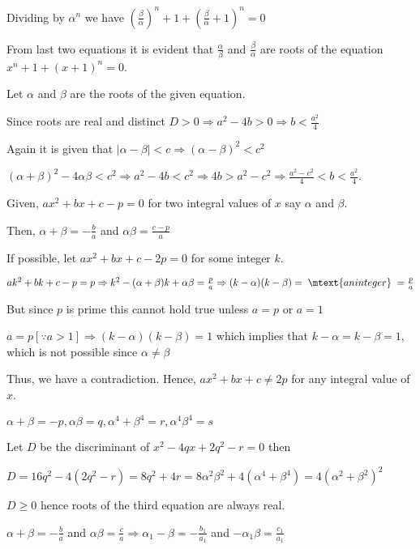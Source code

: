   Dividing by $\alpha^n$ we have
  $\left(\frac{\beta}{\alpha}\right)^n + 1 + \left(\frac{\beta}{\alpha} + 1\right)^n = 0$

  From last two equations it is evident that $\frac{\alpha}{\beta}$ and $\frac{\beta}{\alpha}$ are roots
  of the equation $x^n + 1 + (x + 1)^n = 0$.
\item Let $\alpha$ and $\beta$ are the roots of the given equation.

  Since roots are real and distinct $D > 0 \Rightarrow a^2 - 4b > 0 \Rightarrow b < \frac{a^2}{4}$

  Again it is given that $|\alpha - \beta| < c \Rightarrow (\alpha - \beta)^2 < c^2$

  $(\alpha + \beta)^2 - 4\alpha\beta < c^2 \Rightarrow a^2 - 4b < c^2 \Rightarrow 4b > a^2 - c^2\Rightarrow
  \frac{a^2 - c^2}{4} < b < \frac{a^2}{4}$.
\item Given, $ax^2 + bx + c - p = 0$ for two integral values of $x$ say $\alpha$ and $\beta$.

  Then, $\alpha + \beta = -\frac{b}{a}$ and $\alpha\beta = \frac{c - p}{a}$

  If possible, let $ax^2 + bx + c - 2p = 0$ for some integer $k$.

  $ak^2 + bk + c - p = p \Rightarrow k^2 - (\alpha + \beta)k + \alpha\beta = \frac{p}{a}\Rightarrow (k -
  \alpha)(k - \beta) =\;\mtext{an integer}\;= \frac{p}{a}$

  But since $p$ is prime this cannot hold true unless $a = p$ or $a = 1$

  $a = p [\because a > 1]\Rightarrow (k - \alpha)(k - \beta) = 1$ which implies that $k - \alpha = k - \beta
  = 1$,
  which is not possible since $\alpha \ne \beta$

  Thus, we have a contradiction. Hence, $ax^2 + bx + c \ne 2p$ for any integral value of $x$.
\item $\alpha + \beta = -p, \alpha\beta = q, \alpha^4 + \beta^4 = r, \alpha^4\beta^4 = s$

  Let $D$ be the discriminant of $x^2 - 4qx + 2q^2 - r = 0$ then

  $D = 16q^2 - 4(2q^2 - r) = 8q^2 + 4r = 8\alpha^2\beta^2 + 4(\alpha^4 + \beta^4) = 4(\alpha^2 + \beta^2)^2$

  $D \ge 0$ hence roots of the third equation are always real.
\item $\alpha + \beta = -\frac{b}{a}$ and $\alpha\beta = \frac{c}{a}\Rightarrow \alpha_1 - \beta =
  -\frac{b_1}{a_1}$ and $-\alpha_1\beta = \frac{c_1}{a_1}$

